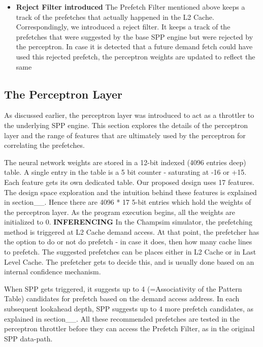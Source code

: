 \documentclass{sig-alternate}
\begin{document}
\begin{itemize}
\item \textbf{Reject Filter introduced}\newline
The Prefetch Filter mentioned above keeps a track of the prefetches that actually happened in the L2 Cache. Correspondingly, we introduced a reject filter. It keeps a track of the prefetches that were suggested by the base SPP engine but were rejected by the perceptron. In case it is detected that a future demand fetch could have used this rejected prefetch, the perceptron weights are updated to reflect the same

\end{itemize}

\subsection{The Perceptron Layer}
As discussed earlier, the perceptron layer was introduced to act as a throttler to the underlying SPP engine. This section explores the details of the perceptron layer and the range of features that are ultimately used by the perceptron for correlating the prefetches.

The neural network weights are stored in a 12-bit indexed (4096 entries deep) table. A single entry in the table is a 5 bit counter - saturating at -16 or +15. Each feature gets its own dedicated table. Our proposed design uses 17 features. The design space exploration and the intuition behind these features is explained in section\_\_. Hence there are 4096 * 17 5-bit entries which hold the weights of the perceptron layer. As the program execution begins, all the weights are initialized to 0.
\newline
\newline
\textbf{INFERENCING}\newline
In the Champsim simulator, the prefetching method is triggered at L2 Cache demand access. At that point, the prefetcher has the option to do or not do prefetch - in case it does, then how many cache lines to prefetch. The suggested prefetches can be places either in L2 Cache or in Last Level Cache. The prefetcher gets to decide this, and is usually done based on an internal confidence mechanism.

When SPP gets triggered, it suggests up to 4 (=Associativity of the Pattern Table) candidates for prefetch based on the demand access address. In each subsequent lookahead depth, SPP suggests up to 4 more prefetch candidates, as explained in section\_\_. All these recommended prefetches are tested in the perceptron throttler before they can access the Prefetch Filter, as in the original SPP data-path.
\end{document}
